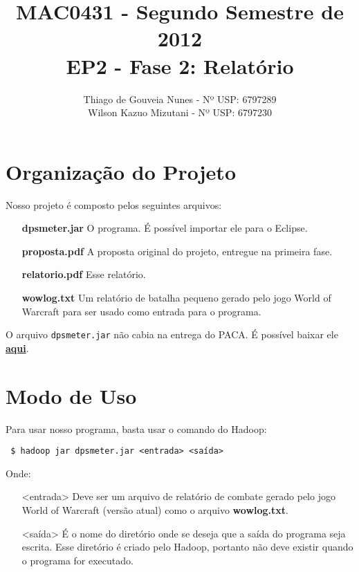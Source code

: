 \documentclass[a4paper,11pt]{article}
\title{MAC0431 - Segundo Semestre de 2012 \\
       EP2 - Fase 2: Relatório}
\author{Thiago de Gouveia Nunes - Nº USP: 6797289 \\
        Wilson Kazuo Mizutani - Nº USP: 6797230}
\begin{document}
\maketitle

\section{Organização do Projeto}

  Nosso projeto é composto pelos seguintes arquivos:
  
  \begin{itemize}
    \item[\textbf{dpsmeter.jar}]
      O programa. É possível importar ele para o Eclipse.
    \item[\textbf{proposta.pdf}]
      A proposta original do projeto, entregue na primeira fase.
    \item[\textbf{relatorio.pdf}]
      Esse relatório.
    \item[\textbf{wowlog.txt}]
      Um relatório de batalha pequeno gerado pelo jogo World of Warcraft para
      ser usado como entrada para o programa.
  \end{itemize}

  O arquivo \verb$dpsmeter.jar$ não cabia na entrega do PACA. É possível baixar
ele \href{http://www.linux.ime.usp.br/~wilsonkmizutani/mac0431/ep2/dpsmeter.jar}
{\textbf{aqui}}.
 
\section{Modo de Uso}

  Para usar nosso programa, basta usar o comando do Hadoop:
  
  \begin{verbatim} $ hadoop jar dpsmeter.jar <entrada> <saída> \end{verbatim}
  
  Onde:
  
  \begin{itemize}
    \item[<entrada>]
      Deve ser um arquivo de relatório de combate gerado pelo jogo World of
      Warcraft (versão atual) como o arquivo \textbf{wowlog.txt}.
    \item[<saída>]
      É o nome do diretório onde se deseja que a saída do programa seja escrita.
      Esse diretório é criado pelo Hadoop, portanto não deve existir quando o
      programa for executado.
  \end{itemize}
  
\end{document}
